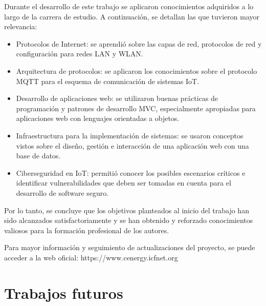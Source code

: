 Durante el desarrollo de este trabajo se aplicaron conocimientos adquiridos a lo largo de la carrera de estudio. A continuación, se detallan las que tuvieron mayor relevancia:


\begin{itemize}

\item Protocolos de Internet: se aprendió sobre las capas de red, protocolos de red y configuración para redes LAN y WLAN. 

\item Arquitectura de protocolos: se aplicaron los conocimientos sobre el protocolo MQTT para el esquema de comunicación de sistemas IoT.

\item Desarrollo de aplicaciones web: se utilizaron buenas prácticas de programación y patrones de desarrollo MVC, especialmente apropiadas para aplicaciones web con lenguajes orientadas a objetos. 

\item Infraestructura para la implementación de sistemas: se usaron conceptos vistos sobre el diseño, gestión e interacción de una aplicación web con una base de datos.

\item Ciberseguridad en IoT: permitió conocer los posibles escenarios críticos e identificar vulnerabilidades que deben ser tomadas en cuenta para el desarrollo de software seguro.

\end{itemize}

Por lo tanto, se concluye que los objetivos planteados al inicio del trabajo han sido alcanzados satisfactoriamente y se han obtenido y reforzado conocimientos valiosos para la formación profesional de los autores.

Para mayor información y seguimiento de actualizaciones del proyecto, se puede acceder a la web oficial: https://www.cenergy.icfnet.org

\section{Trabajos futuros}


